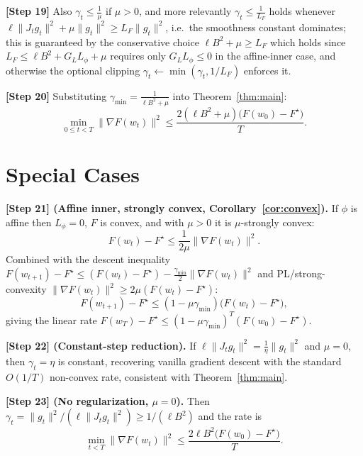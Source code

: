 \documentclass[11pt]{article}
\begin{document}
\textbf{[Step 19]} Also $\gamma_t \le \tfrac{1}{\mu}$ if $\mu>0$, and more
relevantly $\gamma_t \le \tfrac{1}{L_F}$ holds whenever
$\ell\|J_t g_t\|^2 + \mu\|g_t\|^2 \ge L_F \|g_t\|^2$, i.e.\ the smoothness
constant dominates; this is guaranteed by the conservative choice
$\ell B^2 + \mu \ge L_F$ which holds since
$L_F \le \ell B^2 + G_L L_\phi + \mu$ requires only
$G_L L_\phi \le 0$ in the affine-inner case, and otherwise the optional
clipping $\gamma_t\gets\min(\gamma_t, 1/L_F)$ enforces it.

\textbf{[Step 20]} Substituting $\gamma_{\min} = \tfrac{1}{\ell B^2 + \mu}$ into
Theorem~\ref{thm:main}:
\[
\min_{0\le t<T}\|\nabla F(w_t)\|^2
\le \frac{2(\ell B^2 + \mu)\big(F(w_0)-F^\star\big)}{T}.
\]

\section*{Special Cases}

\textbf{[Step 21] (Affine inner, strongly convex, Corollary~\ref{cor:convex}).}
If $\phi$ is affine then $L_\phi = 0$, $F$ is convex, and with $\mu>0$ it is
$\mu$-strongly convex:
\[
F(w_t) - F^\star \le \frac{1}{2\mu}\|\nabla F(w_t)\|^2 .
\]
Combined with the descent inequality
$F(w_{t+1})-F^\star \le (F(w_t)-F^\star) - \tfrac{\gamma_{\min}}{2}\|\nabla F(w_t)\|^2$
and PL/strong-convexity
$\|\nabla F(w_t)\|^2 \ge 2\mu(F(w_t)-F^\star)$:
\[
F(w_{t+1})-F^\star \le (1-\mu\gamma_{\min})\big(F(w_t)-F^\star\big),
\]
giving the linear rate $F(w_T)-F^\star \le (1-\mu\gamma_{\min})^T (F(w_0)-F^\star)$.

\textbf{[Step 22] (Constant-step reduction).}
If $\ell\|J_t g_t\|^2 = \tfrac{1}{\eta}\|g_t\|^2$ and $\mu=0$, then
$\gamma_t = \eta$ is constant, recovering vanilla gradient descent with the
standard $O(1/T)$ non-convex rate, consistent with Theorem~\ref{thm:main}.

\textbf{[Step 23] (No regularization, $\mu=0$).}
Then $\gamma_t = \|g_t\|^2/(\ell\|J_t g_t\|^2)\ge 1/(\ell B^2)$ and the rate is
\[
\min_{t<T}\|\nabla F(w_t)\|^2 \le \frac{2\ell B^2\big(F(w_0)-F^\star\big)}{T}.
\]
\end{document}
